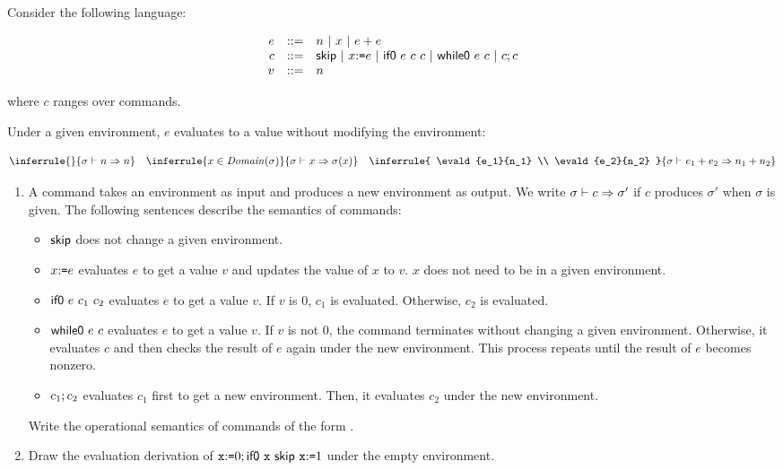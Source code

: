 \begin{exercise}

Consider the following language:

\vspace{-1em}

\[
\begin{array}{rcl}
  e & ::= & n\ |\ x\ |\ e+e \\
  c & ::= & \textsf{skip}\ |\ x{:}\texttt{=} e\ |\ \textsf{if0}\ e\ c\ c
  \ |\ \textsf{while0}\ e\ c\ |\ c;c \\
  v & ::= & n \\
\end{array}
\]

where $c$ ranges over commands.

Under a given environment, $e$ evaluates to a value without modifying the
environment:

\[
  \inferrule
  {}
  { \evald{n}{n} }
  \quad
  \inferrule
  { x\in\dom{\sigma} }
  { \evald{x}{\sigma(x)} }
  \quad
  \inferrule
  { \evald{e_1}{n_1} \\ \evald{e_2}{n_2} }
  { \evald{\eadd{e_1}{e_2}}{n_1+n_2} }
\]

\begin{enumerate}
  \item
    A command takes an environment as input and produces a new environment as
    output. We write $\sigma\vdash c\Rightarrow\sigma'$ if $c$ produces $\sigma'$ when
    $\sigma$ is given.
    The following sentences describe the semantics of commands:
    \begin{itemize}
      \item $\textsf{skip}$ does not change a given environment.
      \item $x{:}\texttt{=} e$ evaluates $e$ to get a value $v$ and
        updates the value of $x$ to $v$. $x$ does not need to be in a given
        environment.
      \item $\textsf{if0}\ e\ c_1\ c_2$ evaluates $e$ to get a value $v$.
        If $v$ is $0$, $c_1$ is evaluated. Otherwise, $c_2$ is evaluated.
      \item $\textsf{while0}\ e\ c$ evaluates $e$ to get a value $v$.
        If $v$ is not $0$, the command terminates without changing a given
        environment. Otherwise, it evaluates $c$ and then checks the result of $e$ again
        under the new environment.
        This process repeats until the result of $e$ becomes nonzero.
      \item $c_1;c_2$ evaluates $c_1$ first to get a new environment.
        Then, it evaluates $c_2$ under the new environment.
    \end{itemize}
    Write the operational semantics of commands of the form
    .

  \item
    Draw the evaluation derivation of
    $\texttt{x}{:}\texttt{=}0;\textsf{if0}\ \texttt{x}\ \textsf{skip}\ \texttt{x}{:}\texttt{=}1$
    under the empty environment.
\end{enumerate}

\end{exercise}
